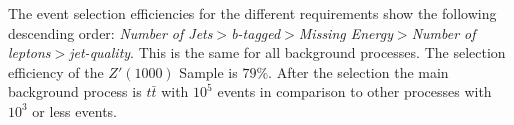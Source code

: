 The event selection efficiencies for the different requirements show the following descending order: \emph{Number of Jets}$>$\emph{b-tagged}$>$\emph{Missing Energy}$>$\emph{Number of leptons}$>$\emph{jet-quality}. This is the same for all background processes. The selection efficiency of the $Z'(1000)$ Sample is $79\%$. After the selection the main background process is $t\bar t$ with $10^5$ events in comparison to other processes with $10^3$ or less events.
	

